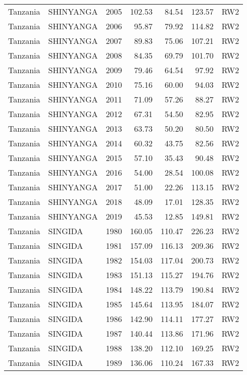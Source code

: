 \begin{longtable}{lllrrrl}
  Tanzania & SHINYANGA & 2005 & 102.53 & 84.54 & 123.57 & RW2 \\ 
  Tanzania & SHINYANGA & 2006 & 95.87 & 79.92 & 114.82 & RW2 \\ 
  Tanzania & SHINYANGA & 2007 & 89.83 & 75.06 & 107.21 & RW2 \\ 
  Tanzania & SHINYANGA & 2008 & 84.35 & 69.79 & 101.70 & RW2 \\ 
  Tanzania & SHINYANGA & 2009 & 79.46 & 64.54 & 97.92 & RW2 \\ 
  Tanzania & SHINYANGA & 2010 & 75.16 & 60.00 & 94.03 & RW2 \\ 
  Tanzania & SHINYANGA & 2011 & 71.09 & 57.26 & 88.27 & RW2 \\ 
  Tanzania & SHINYANGA & 2012 & 67.31 & 54.50 & 82.95 & RW2 \\ 
  Tanzania & SHINYANGA & 2013 & 63.73 & 50.20 & 80.50 & RW2 \\ 
  Tanzania & SHINYANGA & 2014 & 60.32 & 43.75 & 82.56 & RW2 \\ 
  Tanzania & SHINYANGA & 2015 & 57.10 & 35.43 & 90.48 & RW2 \\ 
  Tanzania & SHINYANGA & 2016 & 54.00 & 28.54 & 100.08 & RW2 \\ 
  Tanzania & SHINYANGA & 2017 & 51.00 & 22.26 & 113.15 & RW2 \\ 
  Tanzania & SHINYANGA & 2018 & 48.09 & 17.01 & 128.35 & RW2 \\ 
  Tanzania & SHINYANGA & 2019 & 45.53 & 12.85 & 149.81 & RW2 \\ 
  Tanzania & SINGIDA & 1980 & 160.05 & 110.47 & 226.23 & RW2 \\ 
  Tanzania & SINGIDA & 1981 & 157.09 & 116.13 & 209.36 & RW2 \\ 
  Tanzania & SINGIDA & 1982 & 154.03 & 117.04 & 200.73 & RW2 \\ 
  Tanzania & SINGIDA & 1983 & 151.13 & 115.27 & 194.76 & RW2 \\ 
  Tanzania & SINGIDA & 1984 & 148.22 & 113.79 & 190.84 & RW2 \\ 
  Tanzania & SINGIDA & 1985 & 145.64 & 113.95 & 184.07 & RW2 \\ 
  Tanzania & SINGIDA & 1986 & 142.90 & 114.11 & 177.27 & RW2 \\ 
  Tanzania & SINGIDA & 1987 & 140.44 & 113.86 & 171.96 & RW2 \\ 
  Tanzania & SINGIDA & 1988 & 138.20 & 112.10 & 169.25 & RW2 \\ 
  Tanzania & SINGIDA & 1989 & 136.06 & 110.24 & 167.33 & RW2 \\ 

\end{longtable}
